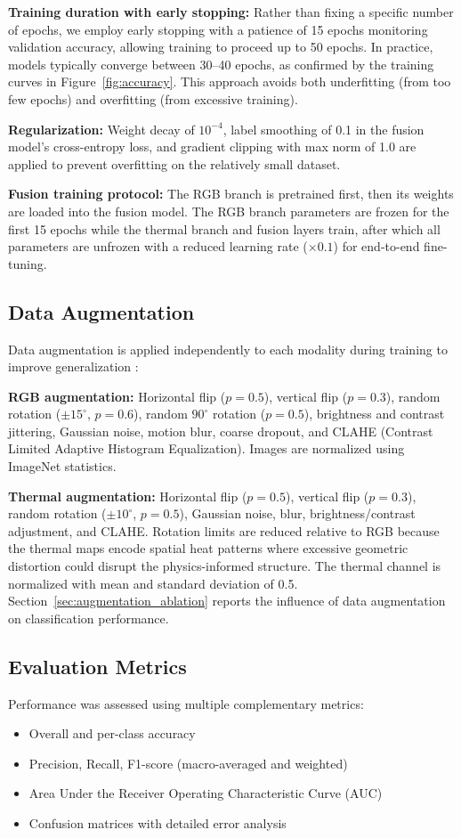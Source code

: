\documentclass[utf8]{FrontiersinHarvard} %
\begin{document}
\textbf{Training duration with early stopping:} Rather than fixing a specific number of epochs, we employ early stopping with a patience of 15 epochs monitoring validation accuracy, allowing training to proceed up to 50 epochs. In practice, models typically converge between 30--40 epochs, as confirmed by the training curves in Figure~\ref{fig:accuracy}. This approach avoids both underfitting (from too few epochs) and overfitting (from excessive training).

\textbf{Regularization:} Weight decay of $10^{-4}$, label smoothing of 0.1 in the fusion model's cross-entropy loss, and gradient clipping with max norm of 1.0 are applied to prevent overfitting on the relatively small dataset.

\textbf{Fusion training protocol:} The RGB branch is pretrained first, then its weights are loaded into the fusion model. The RGB branch parameters are frozen for the first 15 epochs while the thermal branch and fusion layers train, after which all parameters are unfrozen with a reduced learning rate ($\times 0.1$) for end-to-end fine-tuning.

\subsection{Data Augmentation}
Data augmentation is applied independently to each modality during training to improve generalization \cite{shorten2019}:

\textbf{RGB augmentation:} Horizontal flip ($p{=}0.5$), vertical flip ($p{=}0.3$), random rotation ($\pm 15^{\circ}$, $p{=}0.6$), random $90^{\circ}$ rotation ($p{=}0.5$), brightness and contrast jittering, Gaussian noise, motion blur, coarse dropout, and CLAHE (Contrast Limited Adaptive Histogram Equalization). Images are normalized using ImageNet statistics.

\textbf{Thermal augmentation:} Horizontal flip ($p{=}0.5$), vertical flip ($p{=}0.3$), random rotation ($\pm 10^{\circ}$, $p{=}0.5$), Gaussian noise, blur, brightness/contrast adjustment, and CLAHE. Rotation limits are reduced relative to RGB because the thermal maps encode spatial heat patterns where excessive geometric distortion could disrupt the physics-informed structure. The thermal channel is normalized with mean and standard deviation of 0.5. Section~\ref{sec:augmentation_ablation} reports the influence of data augmentation on classification performance.

\subsection{Evaluation Metrics}
Performance was assessed using multiple complementary metrics:
\begin{itemize}
    \item Overall and per-class accuracy
    \item Precision, Recall, F1-score (macro-averaged and weighted)
    \item Area Under the Receiver Operating Characteristic Curve (AUC)
    \item Confusion matrices with detailed error analysis
\end{itemize}
\end{document}
